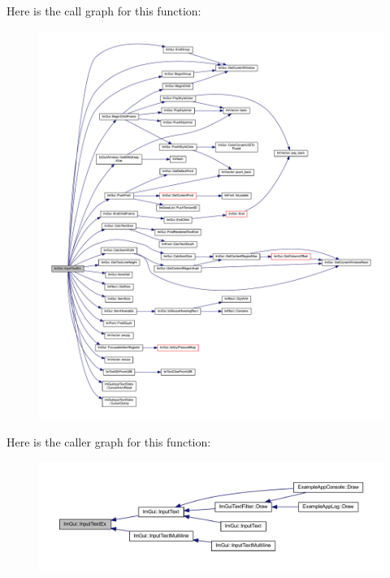 Here is the call graph for this function\+:
\nopagebreak
\begin{figure}[H]
\begin{center}
\leavevmode
\includegraphics[width=350pt]{namespace_im_gui_acc8cda7bb7c80b9dd36bc394723d1606_cgraph}
\end{center}
\end{figure}
Here is the caller graph for this function\+:
\nopagebreak
\begin{figure}[H]
\begin{center}
\leavevmode
\includegraphics[width=350pt]{namespace_im_gui_acc8cda7bb7c80b9dd36bc394723d1606_icgraph}
\end{center}
\end{figure}
\mbox{\label{namespace_im_gui_a81dd8855d2cec99457d2339498cc3c4a}} 
